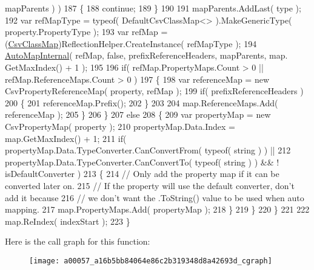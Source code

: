 \begin{DoxyCode}
      mapParents ) )
187                     \{
188                         \textcolor{keywordflow}{continue};
189                     \}
190 
191                     mapParents.AddLast( type );
192                     var refMapType = typeof( DefaultCsvClassMap<> ).MakeGenericType( property.PropertyType 
      );
193                     var refMap = (\hyperlink{a00057_affc5ae8f2b0406d496bcbdf246da6210}{CsvClassMap})ReflectionHelper.CreateInstance( refMapType );
194                     \hyperlink{a00057_a16b5bb84064e86c2b319348d8a42693d}{AutoMapInternal}( refMap, \textcolor{keyword}{false}, prefixReferenceHeaders, mapParents, map.
      GetMaxIndex() + 1 );
195 
196                     \textcolor{keywordflow}{if}( refMap.PropertyMaps.Count > 0 || refMap.ReferenceMaps.Count > 0 )
197                     \{
198                         var referenceMap = \textcolor{keyword}{new} CsvPropertyReferenceMap( property, refMap );
199                         \textcolor{keywordflow}{if}( prefixReferenceHeaders )
200                         \{
201                             referenceMap.Prefix();
202                         \}
203 
204                         map.ReferenceMaps.Add( referenceMap );
205                     \}
206                 \}
207                 \textcolor{keywordflow}{else}
208                 \{
209                     var propertyMap = \textcolor{keyword}{new} CsvPropertyMap( property );
210                     propertyMap.Data.Index = map.GetMaxIndex() + 1;
211                     \textcolor{keywordflow}{if}( propertyMap.Data.TypeConverter.CanConvertFrom( typeof( \textcolor{keywordtype}{string} ) ) ||
212                         propertyMap.Data.TypeConverter.CanConvertTo( typeof( \textcolor{keywordtype}{string} ) ) && !
      isDefaultConverter )
213                     \{
214                         \textcolor{comment}{// Only add the property map if it can be converted later on.}
215                         \textcolor{comment}{// If the property will use the default converter, don't add it because}
216                         \textcolor{comment}{// we don't want the .ToString() value to be used when auto mapping.}
217                         map.PropertyMaps.Add( propertyMap );
218                     \}
219                 \}
220             \}
221 
222             map.ReIndex( indexStart );
223         \}
\end{DoxyCode}


Here is the call graph for this function\-:
\nopagebreak
\begin{figure}[H]
\begin{center}
\leavevmode
\texttt{[image: a00057\_a16b5bb84064e86c2b319348d8a42693d\_cgraph]}
\end{center}
\end{figure}


